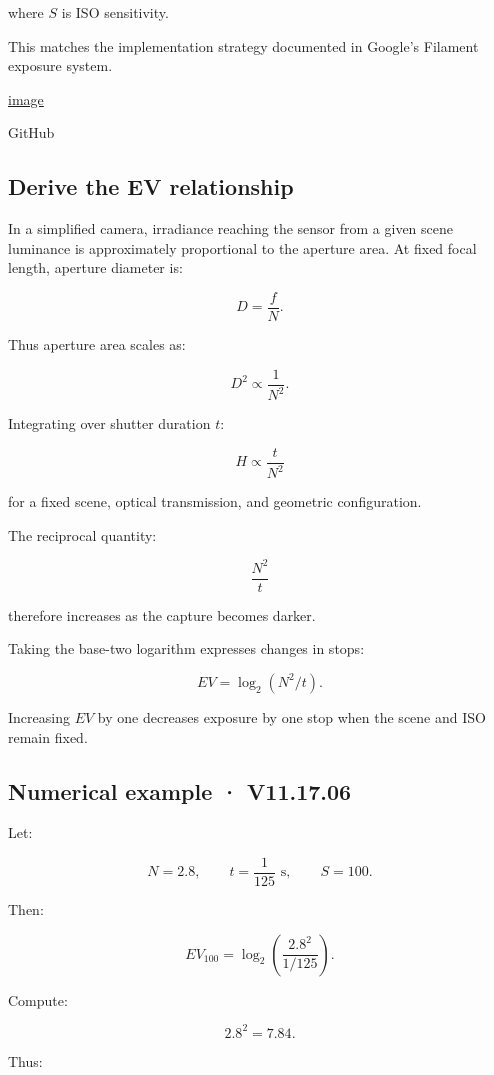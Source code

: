 where \(S\) is ISO sensitivity.

This matches the implementation strategy documented in Google's Filament exposure system. 

\href{https://www.google.com/s2/favicons?domain=https://github.com&sz=32}{image}

GitHub

\subsection{Derive the EV relationship}\label{02-foundations-ii-ch036-derive-the-ev-relationship}

In a simplified camera, irradiance reaching the sensor from a given scene luminance is approximately proportional to the aperture area. At fixed focal length, aperture diameter is:

\[ D=\frac fN. \]

Thus aperture area scales as:

\[ D^2\propto\frac1{N^2}. \]

Integrating over shutter duration \(t\):

\[ \boxed{ H\propto\frac t{N^2} } \]

for a fixed scene, optical transmission, and geometric configuration.

The reciprocal quantity:

\[ \frac{N^2}{t} \]

therefore increases as the capture becomes darker.

Taking the base-two logarithm expresses changes in stops:

\[ EV=\log_2(N^2/t). \]

Increasing \(EV\) by one decreases exposure by one stop when the scene and ISO remain fixed.

\subsection{Numerical example · V11.17.06}\label{02-foundations-ii-ch036-numerical-example-v11.17.06}

Let:

\[ N=2.8,\qquad t=\frac1{125}\text{ s},\qquad S=100. \]

Then:

\[ EV_{100} = \log_2\left( \frac{2.8^2}{1/125} \right). \]

Compute:

\[ 2.8^2=7.84. \]

Thus:

